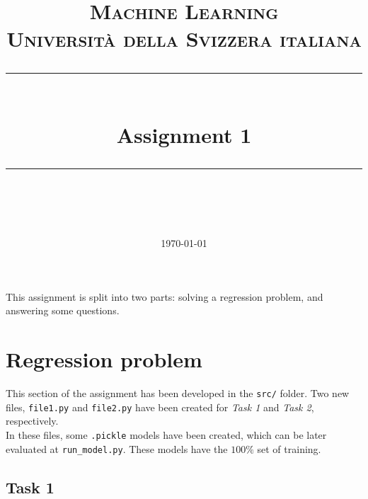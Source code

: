 \documentclass[11pt]{scrartcl}
\title{
    \normalfont\normalsize
    \textsc{Machine Learning\\%
    Universit\`a della Svizzera italiana}\\
    \vspace{25pt}
    \rule{\linewidth}{0.5pt}\\
    \vspace{20pt}
    {\huge Assignment 1}\\
    \vspace{12pt}
    \rule{\linewidth}{1pt}\\
    \vspace{12pt}
}
\author{\LARGE \thestudent}
\date{\normalsize\today}
\begin{document}
    \maketitle

    This assignment is split into two parts: solving a regression problem, and answering some questions.



    \section{Regression problem}

    This section of the assignment has been developed in the \texttt{src/} folder. Two new files, \texttt{file1.py} and \texttt{file2.py} have been created for \textit{Task 1} and \textit{Task 2}, respectively.\\
    In these files, some \texttt{.pickle} models have been created, which can be later evaluated at \texttt{run\_model.py}. These models have the $100\%$ set of training.

    \subsection{Task 1}
\end{document}
